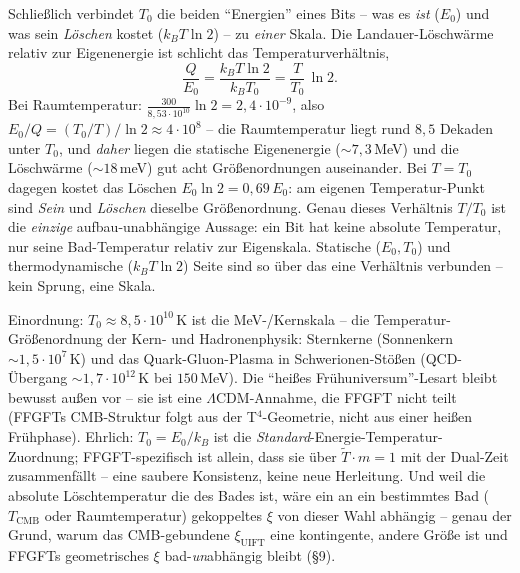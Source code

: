 Schließlich verbindet $T_0$ die beiden \enquote{Energien} eines Bits -- was es \emph{ist} ($E_0$) und was
sein \emph{Löschen} kostet ($k_B T\ln2$) -- zu \emph{einer} Skala. Die Landauer-Löschwärme relativ zur
Eigenenergie ist schlicht das Temperaturverhältnis,
\[
\frac{Q}{E_0}=\frac{k_B T\ln2}{k_B T_0}=\frac{T}{T_0}\,\ln 2.
\]
Bei Raumtemperatur: $\tfrac{300}{8{,}53\cdot10^{10}}\ln2=2{,}4\cdot10^{-9}$, also
$E_0/Q=(T_0/T)/\ln2\approx4\cdot10^{8}$ -- die Raumtemperatur liegt rund $8{,}5$ Dekaden unter $T_0$, und
\emph{daher} liegen die statische Eigenenergie ($\sim7{,}3$\,MeV) und die Löschwärme ($\sim18$\,meV) gut
acht Größenordnungen auseinander. Bei $T=T_0$ dagegen kostet das Löschen $E_0\ln2=0{,}69\,E_0$: am eigenen
Temperatur-Punkt sind \emph{Sein} und \emph{Löschen} dieselbe Größenordnung. Genau dieses Verhältnis
$T/T_0$ ist die \emph{einzige} aufbau-unabhängige Aussage: ein Bit hat keine absolute Temperatur, nur
seine Bad-Temperatur relativ zur Eigenskala. Statische ($E_0,T_0$) und thermodynamische ($k_B T\ln2$)
Seite sind so über das eine Verhältnis verbunden -- kein Sprung, eine Skala.

Einordnung: $T_0\approx8{,}5\cdot10^{10}$\,K ist die MeV-/Kernskala -- die Temperatur-Größenordnung der
Kern- und Hadronenphysik: Sternkerne (Sonnenkern $\sim1{,}5\cdot10^7$\,K) und das Quark-Gluon-Plasma in
Schwerionen-Stößen (QCD-Übergang $\sim1{,}7\cdot10^{12}$\,K bei $150$\,MeV). Die \enquote{heißes
Frühuniversum}-Lesart bleibt bewusst außen vor -- sie ist eine $\Lambda$CDM-Annahme, die FFGFT nicht
teilt (FFGFTs CMB-Struktur folgt aus der T$^4$-Geometrie, nicht aus einer heißen Frühphase). Ehrlich:
$T_0=E_0/k_B$ ist die \emph{Standard}-Energie-Temperatur-Zuordnung; FFGFT-spezifisch ist allein, dass sie
über $\tilde T\cdot m=1$ mit der Dual-Zeit zusammenfällt -- eine saubere Konsistenz, keine neue Herleitung.
Und weil die absolute Löschtemperatur die des Bades ist, wäre ein an ein bestimmtes Bad ($T_\text{CMB}$
oder Raumtemperatur) gekoppeltes $\xi$ von dieser Wahl abhängig -- genau der Grund, warum das
CMB-gebundene $\xi_\text{UIFT}$ eine kontingente, andere Größe ist und FFGFTs geometrisches $\xi$
bad-\emph{un}abhängig bleibt (§9).

